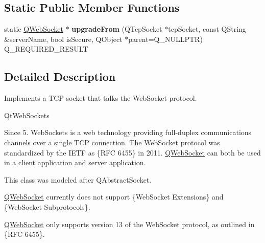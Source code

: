 \subsection*{Static Public Member Functions}
\begin{DoxyCompactItemize}
\item 
\mbox{\label{class_q_web_socket_adb12d7272bd4b12f96de1b85a2c64ee5}} 
static \mbox{\hyperlink{class_q_web_socket}{Q\+Web\+Socket}} $\ast$ {\bfseries upgrade\+From} (Q\+Tcp\+Socket $\ast$tcp\+Socket, const Q\+String \&server\+Name, bool is\+Secure, Q\+Object $\ast$parent=Q\+\_\+\+N\+U\+L\+L\+P\+TR) Q\+\_\+\+R\+E\+Q\+U\+I\+R\+E\+D\+\_\+\+R\+E\+S\+U\+LT
\end{DoxyCompactItemize}


\subsection{Detailed Description}
Implements a T\+CP socket that talks the Web\+Socket protocol. 

Qt\+Web\+Sockets \begin{DoxySince}{Since}
5. Web\+Sockets is a web technology providing full-\/duplex communications channels over a single T\+CP connection. The Web\+Socket protocol was standardized by the I\+E\+TF as  \{R\+FC 6455\} in 2011. \mbox{\hyperlink{class_q_web_socket}{Q\+Web\+Socket}} can both be used in a client application and server application.
\end{DoxySince}
This class was modeled after Q\+Abstract\+Socket.

\mbox{\hyperlink{class_q_web_socket}{Q\+Web\+Socket}} currently does not support  \{Web\+Socket Extensions\} and  \{Web\+Socket Subprotocols\}.

\mbox{\hyperlink{class_q_web_socket}{Q\+Web\+Socket}} only supports version 13 of the Web\+Socket protocol, as outlined in  \{R\+FC 6455\}.

